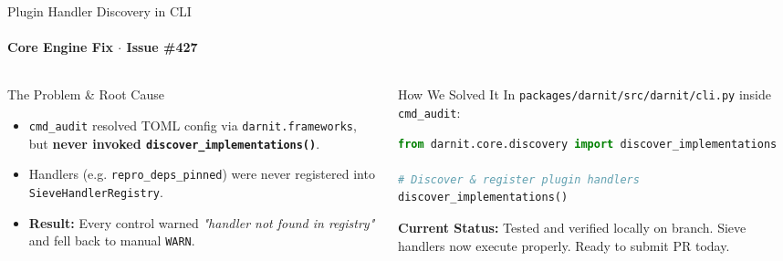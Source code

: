 \documentclass[aspectratio=169]{beamer}
\begin{document}
\begin{frame}{Plugin Handler Discovery in CLI}
    \framesubtitle{Core Engine Fix $\cdot$ Issue \#427}
    \begin{columns}[T]
        \begin{column}{0.48\textwidth}
            \begin{alertblock}{The Problem \& Root Cause}
                \small
                \begin{itemize}
                    \item \texttt{cmd\_audit} resolved TOML config via \texttt{darnit.frameworks}, but \textbf{never invoked \texttt{discover\_implementations()}}.
                    \item Handlers (e.g. \texttt{repro\_deps\_pinned}) were never registered into \texttt{SieveHandlerRegistry}.
                    \item \textbf{Result:} Every control warned \textit{"handler not found in registry"} and fell back to manual \texttt{WARN}.
                \end{itemize}
            \end{alertblock}
        \end{column}
        \begin{column}{0.48\textwidth}
            \begin{block}{How We Solved It}
                \small
                In \texttt{packages/darnit/src/darnit/cli.py} inside \texttt{cmd\_audit}:
                \begin{lstlisting}[language=Python]
from darnit.core.discovery import discover_implementations

# Discover & register plugin handlers
discover_implementations()
                \end{lstlisting}
                \vspace{0.1cm}
                \textbf{Current Status:} Tested and verified locally on branch. Sieve handlers now execute properly. Ready to submit PR today.
            \end{block}
        \end{column}
    \end{columns}
\end{frame}
\end{document}
